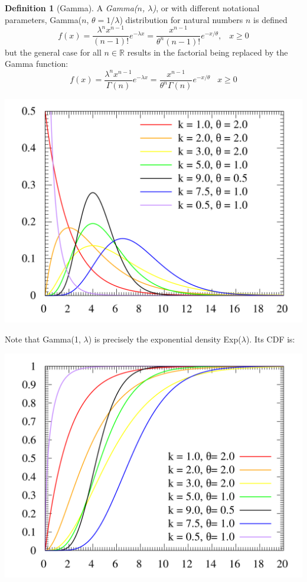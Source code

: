 \documentclass{article}
\theoremstyle{remark}
\theoremstyle{definition}
\newtheorem{definition}{Definition}[section]
\begin{document}
\begin{definition}[Gamma]
A \textit{Gamma($n$, $\lambda$)}, or with different notational parameters, Gamma($n$, $\theta = 1/\lambda$) distribution for natural numbers $n$ is defined 
\[f(x) = \frac{\lambda^n x^{n-1}}{(n-1)!} e^{-\lambda x} = \frac{x^{n-1}}{\theta^n (n-1)!} e^{-x/\theta}, \;\;\; x \geq 0\]
but the general case for all $n \in \mathbb{R}$ results in the factorial being replaced by the Gamma function: 
\[f(x) = \frac{\lambda^n x^{n-1}}{\Gamma(n)} e^{-\lambda x} = \frac{x^{n-1}}{\theta^n \Gamma(n)} e^{-x/\theta}\;\;\; x \geq 0\]
\begin{center}
    \includegraphics[scale=0.15]{img/Gamma_Distribution_Model.png}
\end{center}
Note that Gamma(1, $\lambda$) is precisely the exponential density Exp($\lambda$). Its CDF is: 
\begin{center}
    \includegraphics[scale=0.15]{img/Gamma_Distribution_Model_2.png}
\end{center}
\end{definition}
\end{document}
